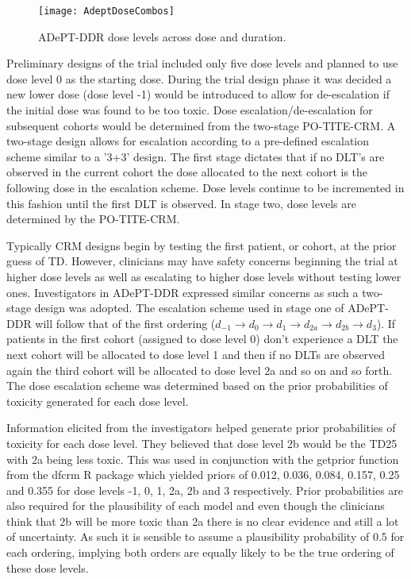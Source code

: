 \begin{figure}[h!]
	\caption{ADePT-DDR dose levels across dose and duration.}
	\label{fig_adept:AZD_dose_levels}
	\texttt{[image: AdeptDoseCombos]}
\end{figure}

Preliminary designs of the trial included only five dose levels and planned to use dose level 0 as the starting dose. During the trial design phase it was decided a new lower dose (dose level -1) would be introduced to allow for de-escalation if the initial dose was found to be too toxic. Dose escalation/de-escalation for subsequent cohorts would be determined from the two-stage PO-TITE-CRM. A two-stage design allows for escalation according to a pre-defined escalation scheme similar to a '3+3' design. The first stage dictates that if no DLT's are observed in the current cohort the dose allocated to the next cohort is the following dose in the escalation scheme. Dose levels continue to be incremented in this fashion until the first DLT is observed. In stage two, dose levels are determined by the PO-TITE-CRM.

Typically CRM designs begin by testing the first patient, or cohort, at the prior guess of TD. However, clinicians may have safety concerns beginning the trial at higher dose levels as well as escalating to higher dose levels without testing lower ones. Investigators in ADePT-DDR expressed similar concerns as such a two-stage design was adopted. The escalation scheme used in stage one of ADePT-DDR will follow that of the first ordering ($d_{-1} \rightarrow d_{0} \rightarrow d_{1} \rightarrow d_{2a} \rightarrow d_{2b} \rightarrow d_{3}$). If patients in the first cohort (assigned to dose level 0) don't experience a DLT the next cohort will be allocated to dose level 1 and then if no DLTs are observed again the third cohort will be allocated to dose level 2a and so on and so forth. The dose escalation scheme was determined based on the prior probabilities of toxicity generated for each dose level.  

Information elicited from the investigators helped generate prior probabilities of toxicity for each dose level. They believed that dose level 2b would be the TD25 with 2a being less toxic. This was used in conjunction with the getprior function from the dfcrm R package \cite{cheungDfcrmDoseFindingContinual2019} which yielded priors of 0.012, 0.036, 0.084, 0.157, 0.25 and 0.355 for dose levels -1, 0, 1, 2a, 2b and 3 respectively. Prior probabilities are also required for the plausibility of each model and even though the clinicians think that 2b will be more toxic than 2a there is no clear evidence and still a lot of uncertainty. As such it is sensible to assume a plausibility probability of 0.5 for each ordering, implying both orders are equally likely to be the true ordering of these dose levels. 

